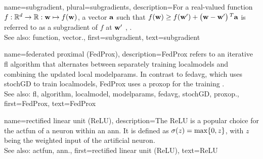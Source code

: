 {name={subgradient}, plural={subgradients},
	description={For a real-valued \gls{function} $f: \mathbb{R}^{d} \rightarrow \mathbb{R}: {\bf w} \mapsto f({\bf w})$, 
		a \gls{vector} ${\bf a}$ such that $f({\bf w}) \geq  f({\bf w}') +\big({\bf w}-{\bf w}' \big)\,^{T} {\bf a}$ is 
		referred to as a subgradient of $f$ at ${\bf w}'$ \cite{BertCvxAnalOpt}, \cite{BertsekasNonLinProgr}.
		\\
		See also: \gls{function}, \gls{vector}.},
	first={subgradient},
	text={subgradient} 
}

{name={federated proximal (FedProx)},
	description={FedProx refers to an iterative \gls{fl} \gls{algorithm} that alternates between separately 
		training \glspl{localmodel} and combining the updated local \glspl{modelparam}. In contrast to \gls{fedavg}, which uses 
		\gls{stochGD} to train \glspl{localmodel}, FedProx uses a \gls{proxop} for the training \cite{FedProx2020}.
					\\ 
		See also: \gls{fl}, \gls{algorithm}, \gls{localmodel}, \glspl{modelparam}, \gls{fedavg}, \gls{stochGD}, \gls{proxop}.}, 
	first={FedProx}, 
	text={FedProx} 
}

{name={rectified linear unit (ReLU)},
	description={The ReLU is 
		a popular choice for the \gls{actfun} of a neuron within an \gls{ann}. It is defined 
		as $\sigma(z) = \max\{0,z\}$, with $z$ being the weighted input of the artificial 
		neuron.
					\\ 
		See also: \gls{actfun}, \gls{ann}.}, 
	first={rectified linear unit (ReLU)}, 
	text={ReLU} 
}

